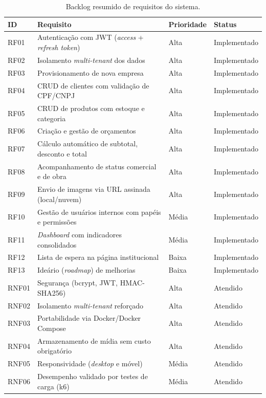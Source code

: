 \begin{table}[H]
  \centering
  \caption{Backlog resumido de requisitos do sistema.}
  \label{tab:backlog}
  \begin{tabular}{p{1.3cm}p{6.5cm}p{2.0cm}p{2.7cm}}
    \hline
    \textbf{ID} & \textbf{Requisito} & \textbf{Prioridade} & \textbf{Status} \\
    \hline
    RF01 & Autenticação com JWT (\textit{access} + \textit{refresh token}) & Alta & Implementado \\
    RF02 & Isolamento \textit{multi-tenant} dos dados & Alta & Implementado \\
    RF03 & Provisionamento de nova empresa & Alta & Implementado \\
    RF04 & CRUD de clientes com validação de CPF/CNPJ & Alta & Implementado \\
    RF05 & CRUD de produtos com estoque e categoria & Alta & Implementado \\
    RF06 & Criação e gestão de orçamentos & Alta & Implementado \\
    RF07 & Cálculo automático de subtotal, desconto e total & Alta & Implementado \\
    RF08 & Acompanhamento de status comercial e de obra & Alta & Implementado \\
    RF09 & Envio de imagens via URL assinada (local/nuvem) & Alta & Implementado \\
    RF10 & Gestão de usuários internos com papéis e permissões & Média & Implementado \\
    RF11 & \textit{Dashboard} com indicadores consolidados & Média & Implementado \\
    RF12 & Lista de espera na página institucional & Baixa & Implementado \\
    RF13 & Ideário (\textit{roadmap}) de melhorias & Baixa & Implementado \\
    RNF01 & Segurança (bcrypt, JWT, HMAC-SHA256) & Alta & Atendido \\
    RNF02 & Isolamento \textit{multi-tenant} reforçado & Alta & Atendido \\
    RNF03 & Portabilidade via Docker/Docker Compose & Alta & Atendido \\
    RNF04 & Armazenamento de mídia sem custo obrigatório & Alta & Atendido \\
    RNF05 & Responsividade (\textit{desktop} e móvel) & Média & Atendido \\
    RNF06 & Desempenho validado por testes de carga (k6) & Média & Atendido \\

\end{tabular}
\end{table}

